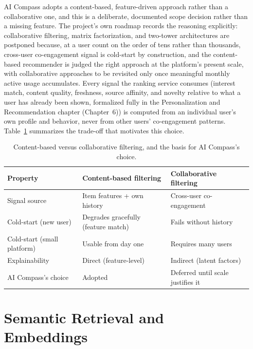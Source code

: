 AI Compass adopts a content-based, feature-driven approach rather than a collaborative one, and this is a deliberate, documented scope decision rather than a missing feature. The project's own roadmap records the reasoning explicitly: collaborative filtering, matrix factorization, and two-tower architectures are postponed because, at a user count on the order of tens rather than thousands, cross-user co-engagement signal is cold-start by construction, and the content-based recommender is judged the right approach at the platform's present scale, with collaborative approaches to be revisited only once meaningful monthly active usage accumulates. Every signal the ranking service consumes (interest match, content quality, freshness, source affinity, and novelty relative to what a user has already been shown, formalized fully in the Personalization and Recommendation chapter (Chapter~6)) is computed from an individual user's own profile and behavior, never from other users' co-engagement patterns. Table~\ref{tab:cb-vs-cf} summarizes the trade-off that motivates this choice.

\begin{table}[htbp]
  \centering
  \caption{Content-based versus collaborative filtering, and the basis for AI Compass's choice.}
  \label{tab:cb-vs-cf}
  \begin{tabular}{|p{3.2cm}|p{6cm}|p{6cm}|}
    \hline
    \textbf{Property} & \textbf{Content-based filtering} & \textbf{Collaborative filtering} \\
    \hline
    Signal source & Item features + own history & Cross-user co-engagement \\
    \hline
    Cold-start (new user) & Degrades gracefully (feature match) & Fails without history \\
    \hline
    Cold-start (small platform) & Usable from day one & Requires many users \\
    \hline
    Explainability & Direct (feature-level) & Indirect (latent factors) \\
    \hline
    AI Compass's choice & Adopted & Deferred until scale justifies it \\
    \hline
  \end{tabular}
\end{table}

\section{Semantic Retrieval and Embeddings}
\label{sec:background-embeddings}

